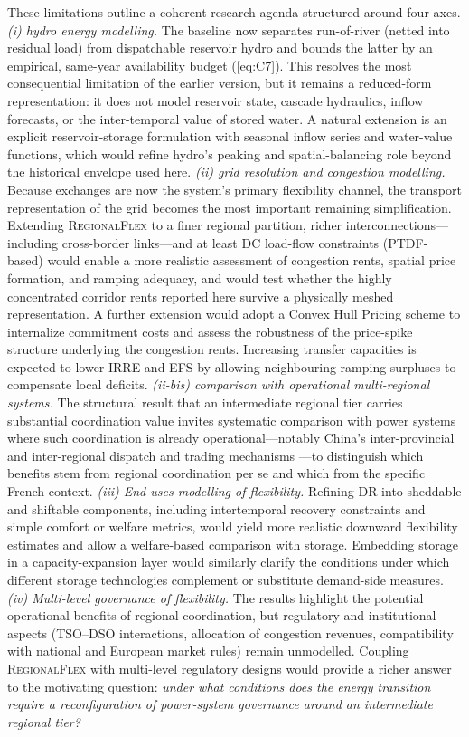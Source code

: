 \documentclass[12pt]{article}
\begin{document}
These limitations outline a coherent research agenda structured around four axes.
\emph{(i) hydro energy modelling.} The baseline now separates run-of-river (netted into residual load) from dispatchable reservoir hydro and bounds the latter by an empirical, same-year availability budget (\cref{eq:C7}). This resolves the most consequential limitation of the earlier version, but it remains a reduced-form representation: it does not model reservoir state, cascade hydraulics, inflow forecasts, or the inter-temporal value of stored water. A natural extension is an explicit reservoir-storage formulation with seasonal inflow series and water-value functions, which would refine hydro's peaking and spatial-balancing role beyond the historical envelope used here.
\emph{(ii) grid resolution and congestion modelling.} Because exchanges are now the system's primary flexibility channel, the transport representation of the grid becomes the most important remaining simplification. Extending 
\textsc{RegionalFlex} to a finer regional partition, richer interconnections---including 
cross-border links---and at least DC load-flow constraints (PTDF-based) would enable a more 
realistic assessment of congestion rents, spatial price formation, and ramping 
adequacy, and would test whether the highly concentrated corridor rents reported here survive a physically meshed representation. A further extension would adopt a Convex Hull Pricing scheme to internalize commitment costs and assess the robustness of the price-spike structure underlying the congestion rents. Increasing transfer capacities is expected to lower IRRE and EFS by allowing 
neighbouring ramping surpluses to compensate local deficits. 
\emph{(ii-bis) comparison with operational multi-regional systems.} The structural result that an intermediate regional tier carries substantial coordination value invites systematic comparison with power systems where such coordination is already operational---notably China's inter-provincial and inter-regional dispatch and trading mechanisms \citep{china_interprovincial,china_regional_dispatch}---to distinguish which benefits stem from regional coordination per se and which from the specific French context.
\emph{(iii) End-uses modelling of flexibility.} Refining DR into sheddable and 
shiftable components, including intertemporal recovery constraints and simple comfort 
or welfare metrics, would yield more realistic downward flexibility estimates and allow 
a welfare-based comparison with storage. Embedding storage in a capacity-expansion 
layer would similarly clarify the conditions under which different storage technologies 
complement or substitute demand-side measures. 
\emph{(iv) Multi-level governance of flexibility.} The results highlight the potential 
operational benefits of regional coordination, but regulatory and institutional aspects 
(TSO--DSO interactions, allocation of congestion revenues, compatibility with national 
and European market rules) remain unmodelled. Coupling \textsc{RegionalFlex} with 
multi-level regulatory designs would provide a richer answer to the motivating 
question: \emph{under what conditions does the energy transition require a 
reconfiguration of power-system governance around an intermediate regional tier?}
\end{document}

